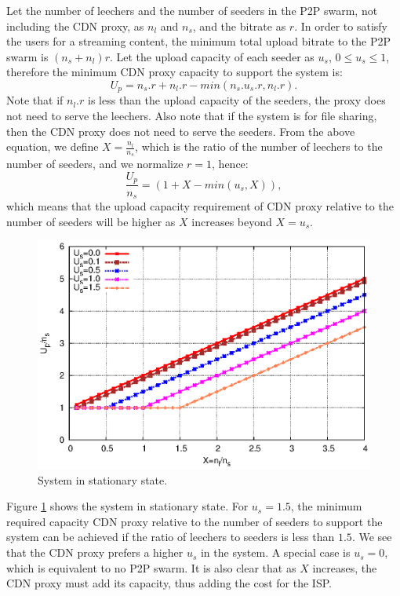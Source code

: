 \documentclass[paper]{ieice}
\begin{document}
Let the number of leechers and the number of seeders in the P2P swarm, not including the CDN proxy, as $n_l$ and $n_s$, and the bitrate as $r$.
In order to satisfy the users for a streaming content, the minimum total upload bitrate to the P2P swarm is $(n_s + n_l)r$.
Let the upload capacity of each seeder as $u_s$, $0 \leq u_s \leq 1$, therefore the minimum CDN proxy capacity to support the system is:
\begin{equation}
        U_p = n_s.r + n_l.r - min(n_s.u_s.r, n_l.r).
\end{equation}
Note that if $n_l.r$ is less than the upload capacity of the seeders, the proxy does not need to serve the leechers.
Also note that if the system is for file sharing, then the CDN proxy does not need to serve the seeders.
From the above equation, we define $X=\frac{n_l}{n_s}$, which is the ratio of the number of leechers to the number of seeders, and we normalize $r=1$, hence:
\begin{equation}
        \frac{U_p}{n_s} = (1 + X - min (u_s,X)),
\end{equation}
which means that the upload capacity requirement of CDN proxy relative to the number of seeders will be higher as $X$ increases beyond $X = u_s$.

\begin{figure}[hb] 
\begin{center}
\includegraphics[scale=0.5]{graphs/stable-steady-state.eps}
\end{center}
\caption{System in stationary state.}
\label{fig:steadystate}
\vspace{-2mm}
\end{figure}

Figure \ref{fig:steadystate} shows the system in stationary state.
For $u_s=1.5$, the minimum required capacity CDN proxy relative to the number of seeders to support the system can be achieved if the ratio of leechers to seeders is less than $1.5$.
We see that the CDN proxy prefers a higher $u_s$ in the system.
A special case is $u_s = 0$, which is equivalent to no P2P swarm.
It is also clear that as $X$ increases, the CDN proxy must add its capacity, thus adding the cost for the ISP.
\end{document}
